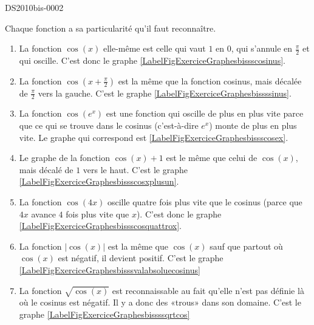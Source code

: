 
\begin{corrige}{DS2010bis-0002}

	Chaque fonction a sa particularité qu'il faut reconnaître.
	\begin{enumerate}
		\item
			La fonction $\cos(x)$ elle-même est celle qui vaut $1$ en $0$, qui s'annule en $\frac{ \pi }{2}$ et qui oscille. C'est donc le graphe \ref{LabelFigExerciceGraphesbissscosinus}.
		\item
			La fonction $\cos(x+\frac{ \pi }{2})$ est la même que la fonction cosinus, mais décalée de $\frac{ \pi }{2}$ vers la gauche. C'est le graphe  \ref{LabelFigExerciceGraphesbissssinus}.
		\item
			La fonction $\cos( e^{x})$ est une fonction qui oscille de plus en plus vite parce que ce qui se trouve dans le cosinus (c'est-à-dire  $ e^{x}$) monte de plus en plus vite. Le graphe qui correspond est \ref{LabelFigExerciceGraphesbissscosex}.
		\item
			Le graphe de la fonction $\cos(x)+1$ est le même que celui de $\cos(x)$, mais décalé de $1$ vers le haut. C'est le graphe \ref{LabelFigExerciceGraphesbissscosxplusun}.
		\item
			La fonction $\cos(4x)$ oscille quatre fois plus vite que le cosinus (parce que $4x$ avance $4$ fois plus vite que $x$). C'est donc le graphe \ref{LabelFigExerciceGraphesbissscosquattrox}.
		\item
			La fonction $| \cos(x) |$ est la même que $\cos(x)$ sauf que partout où $\cos(x)$ est négatif, il devient positif. C'est le graphe \ref{LabelFigExerciceGraphesbisssvalabsoluecosinus}
		\item
			La fonction $\sqrt{\cos(x)}$ est reconnaissable au fait qu'elle n'est pas définie là où le cosinus est négatif. Il y a donc des «trous» dans son domaine. C'est le graphe \ref{LabelFigExerciceGraphesbissssqrtcos}
	\end{enumerate}
	
\end{corrige}
